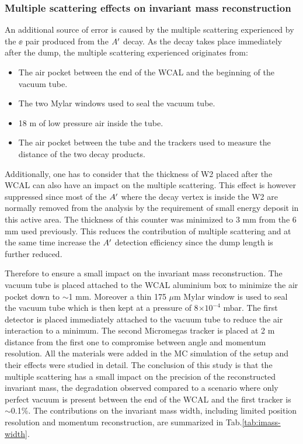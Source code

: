 \subsubsection{Multiple scattering effects on invariant mass reconstruction}
\label{ch5:sec:mm-scattering}

An additional source of error is caused by the multiple scattering experienced by the $\ee$ pair produced from the $A'$ decay. As the decay takes place immediately after the dump, the multiple scattering experienced originates from:

\begin{itemize}
\item The air pocket between the end of the WCAL and the beginning of the vacuum tube.
\item The two Mylar windows used to seal the vacuum tube.
\item 18 m of low pressure air inside the tube.
\item The air pocket between the tube and the trackers used to measure the distance of the two decay products.
\end{itemize}

Additionally, one has to consider that the thickness of W2 placed after the WCAL can also have an impact on the multiple scattering. This effect is however suppressed since most of the $A'$ where the decay vertex is inside the W2 are normally removed from the analysis by the requirement of small energy deposit in this active area. The thickness of this counter was minimized to 3 mm from the 6 mm used previously. This reduces the contribution of multiple scattering and at the same time increase the $A'$ detection efficiency since the dump length is further reduced.

Therefore to ensure a small impact on the invariant mass reconstruction. The vacuum tube is placed attached to the WCAL aluminium box to minimize the air pocket down to $\sim$1 mm. Moreover a thin 175 $\mu$m Mylar window is used to seal the vacuum tube which is then kept at a pressure of 8$\times 10^{-4}$ mbar. The first detector is placed immediately attached to the vacuum tube to reduce the air interaction to a minimum. The second Micromegas tracker is placed at 2 m distance from the first one to compromise between angle and momentum resolution. All the materials were added in the MC simulation of the setup and their effects were studied in detail. The conclusion of this study is that the multiple scattering has a small impact on the precision of the reconstructed invariant mass, the degradation observed compared to a scenario where only perfect vacuum is present between the end of the WCAL and the first tracker is $\sim$0.1\%. The contributions on the invariant mass width, including limited position resolution and momentum reconstruction, are summarized in Tab.\ref{tab:imass-width}.

